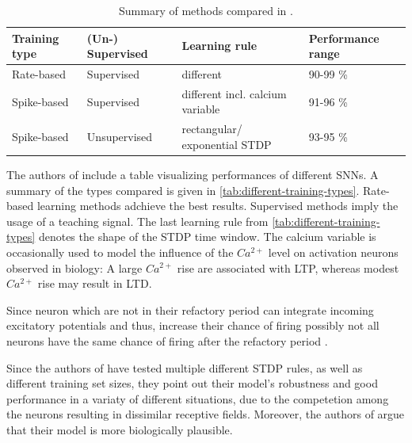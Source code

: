 \begin{table}[]
    \begin{tabular}{|l|l|l|l|}
    \hline
    \textbf{Training type} & \textbf{(Un-) Supervised}    & \textbf{Learning rule}               & \textbf{Performance range} \\ \hline
    Rate-based             & Supervised                   & different                            & 90-99 \%                   \\ \hline
    Spike-based            & Supervised                   & different incl. calcium variable & 91-96 \%                   \\ \hline
    Spike-based            & Unsupervised                 & rectangular/ exponential \ac{STDP}        & 93-95 \%                   \\ \hline
    \end{tabular}
    \caption{Summary of methods compared in \cite{SNN}.}
    \label{tab:different-training-types}
\end{table}

The authors of \cite{SNN} include a table visualizing performances of different \acp{SNN}.
A summary of the types compared is given in \autoref{tab:different-training-types}.
Rate-based learning methods adchieve the best results.
Supervised methods imply the usage of a teaching signal.
The last learning rule from \autoref{tab:different-training-types} denotes the shape of the \ac{STDP} time window.
The calcium variable \cite{STDP_hebbian} is occasionally used to model the influence of the $Ca^{2+}$ level on activation neurons observed in biology:
A large $Ca^{2+}$ rise are associated with \ac{LTP}, whereas modest $Ca^{2+}$ rise may result in \ac{LTD}.

Since neuron which are not in their refactory period can integrate incoming excitatory potentials and thus, 
increase their chance of firing possibly not all neurons have the same chance of firing after the refactory period \cite{SNN}.

Since the authors of \cite{SNN} have tested multiple different \ac{STDP} rules, as well as different training set sizes, 
they point out their model's robustness and good performance in a variaty of different situations, 
due to the competetion among the neurons resulting in dissimilar receptive fields.
Moreover, the authors of \cite{SNN} argue that their model is more biologically plausible.
